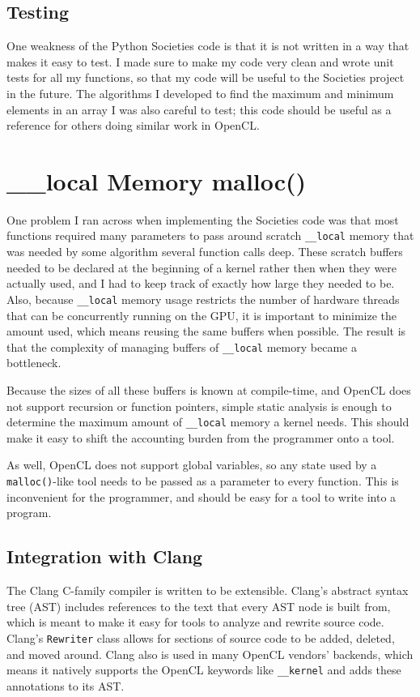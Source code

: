 \documentclass{article}
\begin{document}
\subsection{Testing}
One weakness of the Python Societies code is that it is not written in a way that makes it easy to test. I made sure to make my code very clean  and wrote unit tests for all my functions, so that my code will be useful to the Societies project in the future. The algorithms I developed to find the maximum and minimum elements in an array I was also careful to test; this code should be useful as a reference for others doing similar work in OpenCL.

\section{\_\_local Memory malloc()}
One problem I ran across when implementing the Societies code was that most functions required many parameters to pass around scratch \texttt{\_\_local} memory that was needed by some algorithm several function calls deep. These scratch buffers needed to be declared at the beginning of a kernel rather then when they were actually used, and I had to keep track of exactly how large they needed to be. Also, because \texttt{\_\_local} memory usage restricts the number of hardware threads that can be concurrently running on the GPU, it is important to minimize the amount used, which means reusing the same buffers when possible. The result is that the complexity of managing buffers of \texttt{\_\_local} memory became a bottleneck.

Because the sizes of all these buffers is known at compile-time, and OpenCL does not support recursion or function pointers, simple static analysis is enough to determine the maximum amount of \texttt{\_\_local} memory a kernel needs. This should make it easy to shift the accounting burden from the programmer onto a tool.

As well, OpenCL does not support global variables, so any state used by a \texttt{malloc()}-like tool needs to be passed as a parameter to every function. This is inconvenient for the programmer, and should be easy for a tool to write into a program.

\subsection{Integration with Clang}
The Clang C-family compiler is written to be extensible. Clang's abstract syntax tree (AST) includes references to the text that every AST node is built from, which is meant to make it easy for tools to analyze and rewrite source code. Clang's \texttt{Rewriter} class allows for sections of source code to be added, deleted, and moved around. Clang also is used in many OpenCL vendors' backends, which means it natively supports the OpenCL keywords like \texttt{\_\_kernel} and adds these annotations to its AST.
\end{document}
